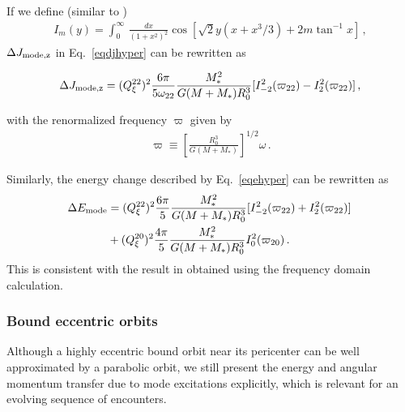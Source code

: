 \documentclass[prd,aps,floatfix,superscriptaddress,nofootinbib,twocolumn,10pt,English]{revtex4}
\begin{document}
 If we define (similar to \cite{press1977formation})
 \begin{align}\label{eqi}
 I_{m}(y)  = \int^\infty_0  \, \frac{dx}{(1+x^2)^2} \cos {[\sqrt{2} y (x+x^3/3)+2 m \tan^{-1} x]}\,,
 \end{align}
 $\Delta J_{\rm mode,z}$ in Eq.~\eqref{eqdjhyper} can be rewritten as
\begin{widetext}
 \begin{align}\label{eqjmodez}
 \Delta J_{\rm mode,z} = (Q^{22}_\xi)^2 \frac{6 \pi}{5 \omega_{22}} \frac{M^2_*}{G(M+M_*)R^3_0}[I^2_{-2}(\varpi_{22})-I^2_{2}(\varpi_{22})]\,,
 \end{align}
\end{widetext}
  with the renormalized frequency $\varpi$ given by
  \begin{align}
  \varpi \equiv \left [\frac{R^3_0}{G(M+M_*)} \right ]^{1/2} \omega\,.
  \end{align}

Similarly, the energy change described by Eq.~\eqref{eqehyper} can be rewritten as
 \begin{align}\label{eqemodef}
 \Delta E_{\rm mode} & = (Q^{22}_\xi)^2 \frac{6 \pi}{5} \frac{M^2_*}{G(M+M_*)R^3_0}[I^2_{-2}(\varpi_{22})+I^2_{2}(\varpi_{22})]\,\nonumber \\
 &+(Q^{20}_\xi)^2 \frac{4 \pi}{5 } \frac{M^2_*}{G(M+M_*)R^3_0} I^2_{0}(\varpi_{20})\,.
   \end{align} 
 This is consistent with the result in  \cite{press1977formation} obtained using the frequency domain calculation.
 
\subsubsection{Bound eccentric orbits}

Although a highly eccentric bound orbit near its pericenter can be well approximated by a parabolic orbit, we still present the energy and angular momentum transfer due to mode excitations explicitly, which is relevant for an evolving sequence of encounters.
\end{document}
